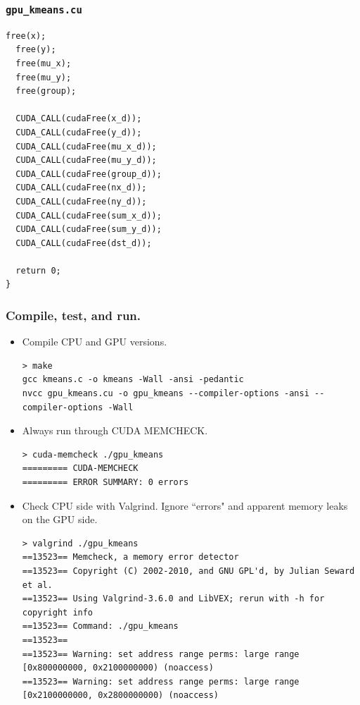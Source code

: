 \documentclass[handout]{beamer}
\numberwithin{equation}{section}
\begin{document}
\begin{frame}[fragile]
\frametitle{{\tt gpu\_kmeans.cu}}
\begin{lstlisting}[name=km]
  free(x);
  free(y);
  free(mu_x);
  free(mu_y);
  free(group);

  CUDA_CALL(cudaFree(x_d));
  CUDA_CALL(cudaFree(y_d));
  CUDA_CALL(cudaFree(mu_x_d));
  CUDA_CALL(cudaFree(mu_y_d));
  CUDA_CALL(cudaFree(group_d));
  CUDA_CALL(cudaFree(nx_d));
  CUDA_CALL(cudaFree(ny_d));
  CUDA_CALL(cudaFree(sum_x_d));
  CUDA_CALL(cudaFree(sum_y_d));
  CUDA_CALL(cudaFree(dst_d));

  return 0;
}

\end{lstlisting}
\end{frame}

\lstset{language = bash}

\begin{frame}[fragile]
\frametitle{Compile, test, and run.}
\begin{itemize}
\item Compile CPU and GPU versions.
\begin{lstlisting}
> make
gcc kmeans.c -o kmeans -Wall -ansi -pedantic
nvcc gpu_kmeans.cu -o gpu_kmeans --compiler-options -ansi --compiler-options -Wall
\end{lstlisting}
\pause \item Always run through CUDA MEMCHECK.
\begin{lstlisting}
> cuda-memcheck ./gpu_kmeans
========= CUDA-MEMCHECK
========= ERROR SUMMARY: 0 errors
\end{lstlisting}
\pause \item Check CPU side with Valgrind. Ignore ``errors" and apparent memory leaks on the GPU side.
\begin{lstlisting}
> valgrind ./gpu_kmeans
==13523== Memcheck, a memory error detector
==13523== Copyright (C) 2002-2010, and GNU GPL'd, by Julian Seward et al.
==13523== Using Valgrind-3.6.0 and LibVEX; rerun with -h for copyright info
==13523== Command: ./gpu_kmeans
==13523== 
==13523== Warning: set address range perms: large range [0x800000000, 0x2100000000) (noaccess)
==13523== Warning: set address range perms: large range [0x2100000000, 0x2800000000) (noaccess)
\end{lstlisting}
\end{itemize}
\end{frame}
\end{document}

